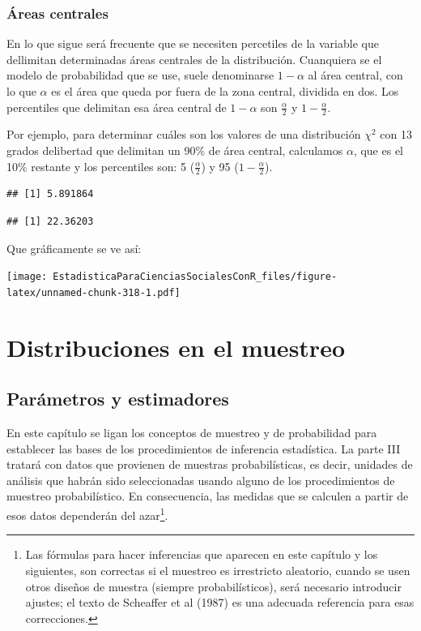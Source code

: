 \documentclass[]{book}
\let\rmarkdownfootnote\footnote%
\def\footnote{\protect\rmarkdownfootnote}
\begin{document}
\hypertarget{uxe1reas-centrales}{%
\subsection{Áreas centrales}\label{uxe1reas-centrales}}

En lo que sigue será frecuente que se necesiten percetiles de la variable que dellimitan determinadas áreas centrales de la distribución. Cuanquiera se el modelo de probabilidad que se use, suele denominarse \(1-\alpha\) al área central, con lo que \(\alpha\) es el área que queda por fuera de la zona central, dividida en dos. Los percentiles que delimitan esa área central de \(1-\alpha\) son \(\frac{\alpha}{2}\) y \(1-\frac{\alpha}{2}\).

Por ejemplo, para determinar cuáles son los valores de una distribución \(\chi^2\) con 13 grados delibertad que delimitan un 90\% de área central, calculamos \(\alpha\), que es el 10\% restante y los percentiles son: 5 (\(\frac{\alpha}{2}\)) y 95 (\(1-\frac{\alpha}{2}\)).

\begin{verbatim}
## [1] 5.891864
\end{verbatim}

\begin{verbatim}
## [1] 22.36203
\end{verbatim}

Que gráficamente se ve así:

\texttt{[image: EstadisticaParaCienciasSocialesConR\_files/figure-latex/unnamed-chunk-318-1.pdf]}

\hypertarget{distribuciones-en-el-muestreo}{%
\chapter{Distribuciones en el muestreo}\label{distribuciones-en-el-muestreo}}

\hypertarget{paruxe1metros-y-estimadores}{%
\section{Parámetros y estimadores}\label{paruxe1metros-y-estimadores}}

En este capítulo se ligan los conceptos de muestreo y de probabilidad
para establecer las bases de los procedimientos de inferencia
estadística. La parte III tratará con datos que provienen de muestras
probabilísticas, es decir, unidades de análisis que habrán sido
seleccionadas usando alguno de los procedimientos de muestreo
probabilístico. En consecuencia, las medidas que se calculen a partir de esos datos dependerán del azar\footnote{Las fórmulas para hacer inferencias que aparecen en este capítulo y los siguientes, son correctas si el muestreo es irrestricto aleatorio, cuando se usen otros diseños de muestra (siempre probabilísticos), será necesario introducir ajustes; el texto de Scheaffer et al (1987) es una adecuada referencia para esas correcciones.}.
\end{document}
